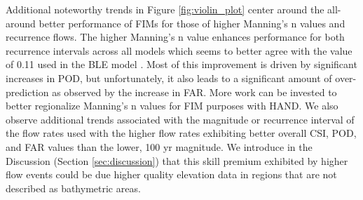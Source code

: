 Additional noteworthy trends in Figure \ref{fig:violin_plot} center around the all-around better performance of FIMs for those of higher Manning's n values and recurrence flows.
The higher Manning's n value enhances performance for both recurrence intervals across all models which seems to better agree with the value of 0.11 used in the BLE model \cite{fema2021base,fema2021estimated}.
Most of this improvement is driven by significant increases in POD, but unfortunately, it also leads to a significant amount of over-prediction as observed by the increase in FAR.
More work can be invested to better regionalize Manning's n values for FIM purposes with HAND.
We also observe additional trends associated with the magnitude or recurrence interval of the flow rates used with the higher flow rates exhibiting better overall CSI, POD, and FAR values than the lower, 100 yr magnitude.
We introduce in the Discussion (Section \ref{sec:discussion}) that this skill premium exhibited by higher flow events could be due higher quality elevation data in regions that are not described as bathymetric areas.
%
